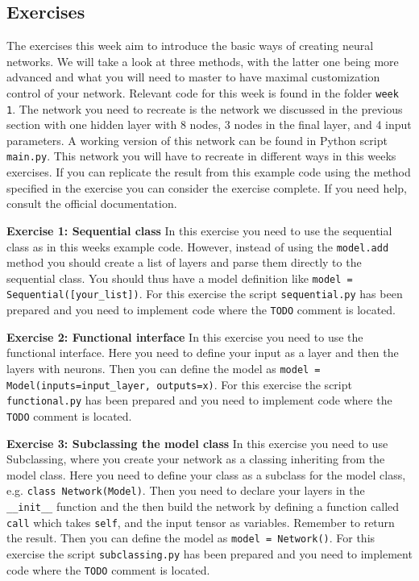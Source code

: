 \documentclass[12pt,a4paper]{article} %
\numberwithin{equation}{section}
\begin{document}
	\subsection{Exercises}
		The exercises this week aim to introduce the basic ways of creating neural networks. We will take a look at three methods, with the latter one being more advanced and what you will need to master to have maximal customization control of your network. Relevant code for this week is found in the folder \texttt{week 1}. The network you need to recreate is the network we discussed in the previous section with one hidden layer with 8 nodes, 3 nodes in the final layer, and 4 input parameters. A working version of this network can be found in Python script \texttt{main.py}. This network you will have to recreate in different ways in this weeks exercises. If you can replicate the result from this example code using the method specified in the exercise you can consider the exercise complete. If you need help, consult the official documentation. \newline
		
		\textbf{Exercise 1: Sequential class}\newline
		In this exercise you need to use the sequential class as in this weeks example code. However, instead of using the \texttt{model.add} method you should create a list of layers and parse them directly to the sequential class. You should thus have a model definition like \texttt{model = Sequential([your\_list])}. For this exercise the script \texttt{sequential.py} has been prepared and you need to implement code where the \texttt{TODO} comment is located.\newline
		
		\textbf{Exercise 2: Functional interface}\newline
		In this exercise you need to use the functional interface. Here you need to define your input as a layer and then the layers with neurons. Then you can define the model as \texttt{model = Model(inputs=input\_layer, outputs=x)}. For this exercise the script \texttt{functional.py} has been prepared and you need to implement code where the \texttt{TODO} comment is located.\newline
		
		\textbf{Exercise 3: Subclassing the model class}\newline
		In this exercise you need to use Subclassing, where you create your network as a classing inheriting from the model class. Here you need to define your class as a subclass for the model class, e.g. \texttt{class Network(Model)}. Then you need to declare your layers in the \texttt{\_\_init\_\_} function and the then build the network by defining a function called \texttt{call} which takes \texttt{self}, and the input tensor as variables. Remember to return the result. Then you can define the model as \texttt{model = Network()}. For this exercise the script \texttt{subclassing.py} has been prepared and you need to implement code where the \texttt{TODO} comment is located.\newline
		
\end{document}
